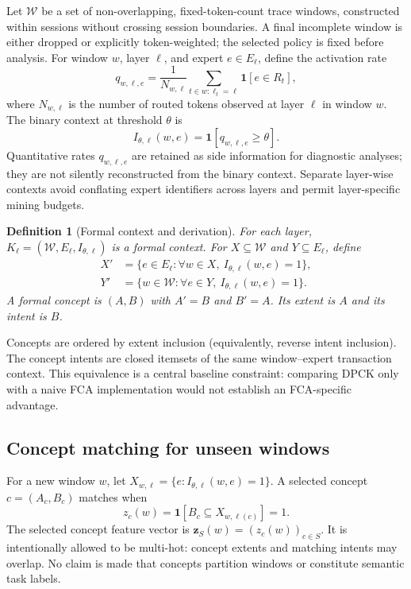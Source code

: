 \documentclass[a4paper,preprint,review,12pt,authoryear]{elsarticle}
\newtheorem{definition}{Definition}
\newcommand{\Wcal}{\mathcal{W}}
\begin{document}
Let $\Wcal$ be a set of non-overlapping, fixed-token-count trace windows, constructed within sessions without crossing session boundaries. A final incomplete window is either dropped or explicitly token-weighted; the selected policy is fixed before analysis. For window $w$, layer $\ell$, and expert $e\in E_\ell$, define the activation rate
\begin{equation}
 q_{w,\ell,e}=\frac{1}{N_{w,\ell}}\sum_{t\in w:\ell_t=\ell}\mathbf{1}[e\in R_t],
 \label{eq:rate}
\end{equation}
where $N_{w,\ell}$ is the number of routed tokens observed at layer $\ell$ in window $w$. The binary context at threshold $\theta$ is
\begin{equation}
 I_{\theta,\ell}(w,e)=\mathbf{1}[q_{w,\ell,e}\ge\theta].
 \label{eq:context}
\end{equation}
Quantitative rates $q_{w,\ell,e}$ are retained as side information for diagnostic analyses; they are not silently reconstructed from the binary context. Separate layer-wise contexts avoid conflating expert identifiers across layers and permit layer-specific mining budgets.

\begin{definition}[Formal context and derivation]
For each layer, $K_\ell=(\Wcal,E_\ell,I_{\theta,\ell})$ is a formal context. For $X\subseteq\Wcal$ and $Y\subseteq E_\ell$, define
\begin{align}
 X'&=\{e\in E_\ell:\forall w\in X,\ I_{\theta,\ell}(w,e)=1\},\\
 Y'&=\{w\in\Wcal:\forall e\in Y,\ I_{\theta,\ell}(w,e)=1\}.
\end{align}
A formal concept is $(A,B)$ with $A'=B$ and $B'=A$. Its extent is $A$ and its intent is $B$.
\end{definition}

Concepts are ordered by extent inclusion (equivalently, reverse intent inclusion). The concept intents are closed itemsets of the same window--expert transaction context. This equivalence is a central baseline constraint: comparing DPCK only with a naive FCA implementation would not establish an FCA-specific advantage.

\subsection{Concept matching for unseen windows}

For a new window $w$, let $X_{w,\ell}=\{e:I_{\theta,\ell}(w,e)=1\}$. A selected concept $c=(A_c,B_c)$ matches when
\begin{equation}
 z_c(w)=\mathbf{1}[B_c\subseteq X_{w,\ell(c)}]=1.
 \label{eq:feature}
\end{equation}
The selected concept feature vector is $\bm z_S(w)=(z_c(w))_{c\in S}$. It is intentionally allowed to be multi-hot: concept extents and matching intents may overlap. No claim is made that concepts partition windows or constitute semantic task labels.
\end{document}
